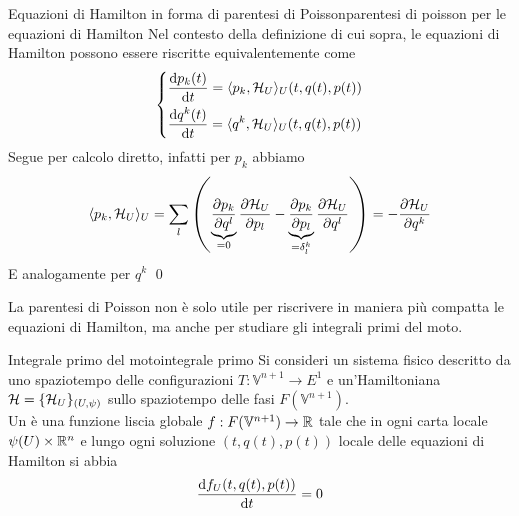 \documentclass[openany]{book}
\renewcommand\V{\mathbb{V}}
\begin{document}
\begin{proposition}{Equazioni di Hamilton in forma di parentesi di Poisson}{parentesi di poisson per le equazioni di Hamilton}
    Nel contesto della definizione di cui sopra, le equazioni di Hamilton possono essere riscritte equivalentemente come 
    \[ \begin{dcases}
        \frac{\text{d} p_k(t)}{\text{d} t} = \langle p_k, \mathcal{H}_U\rangle_U(t,q(t),p(t)) \\
        \frac{\text{d} q^k(t)}{\text{d} t} = \langle q^k, \mathcal{H}_U\rangle_U(t,q(t),p(t))
    \end{dcases} \]
    \proof 
    Segue per calcolo diretto, infatti per $p_k$ abbiamo 
    \[ \langle p_k, \mathcal{H}_U\rangle_U = \sum_l \left( \underbrace{\frac{\partial p_k}{\partial q^l}}_{=0}\frac{\partial \mathcal{H}_U}{\partial p_l} - \underbrace{\frac{\partial p_k}{\partial p_l}}_{=\delta_l^k}\frac{\partial \mathcal{H}_U}{\partial q^l} \right) = -\frac{\partial \mathcal{H}_U}{\partial q^k} \]
    E analogamente per $q^k$
    \qed 
\end{proposition}

La parentesi di Poisson non è solo utile per riscrivere in maniera più compatta le equazioni di Hamilton, ma anche per studiare gli integrali primi del moto.

\begin{definition}{Integrale primo del moto}{integrale primo}
    Si consideri un sistema fisico descritto da uno spaziotempo delle configurazioni $T:\V^{n+1}\to E^1$ e un'Hamiltoniana $\mathcal{H} = \{\mathcal{H}_U\}_{(U,\psi)}$ sullo spaziotempo delle fasi $F(\V^{n+1})$.\\
    Un  è una funzione liscia globale $f:F(\V^{n+1})\to \R$ tale che in ogni carta locale $\psi(U)\times\mathbb{R}^n$ e lungo ogni soluzione $(t,q(t),p(t))$ locale delle equazioni di Hamilton si abbia 
    \[\frac{\text{d} f_U(t,q(t),p(t))}{\text{d} t} = 0\]
\end{definition}
\end{document}
